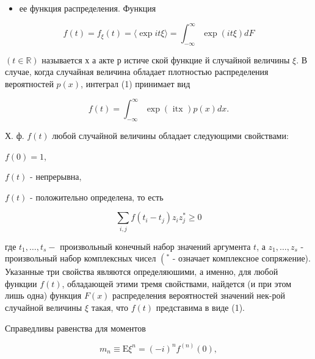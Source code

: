 \documentclass[10pt]{article}
\begin{document}
\begin{itemize}

  \item ее функция распределения. Функция

\end{itemize}



\[

f(t)=f_{\xi}(t)=\langle\exp i t \xi\rangle=\int_{-\infty}^{\infty} \exp (i t \xi) d F

\]



$(t \in \mathbb{R})$ называется х а акте р истиче ской функцие й случайной величины $\xi$. В случае, когда случайная величина обладает плотностью распределения вероятностей $p(x)$, интеграл (1) принимает вид



\[

f(t)=\int_{-\infty}^{\infty} \exp (\text { itx }) p(x) d x .

\]



Х. ф. $f(t)$ любой случайной величины обладает следующими свойствами:



$f(0)=1$,



$f(t)$ - непрерывна,



$f(t)$ - положительно определена, то есть



\[

\sum_{i, j} f\left(t_{i}-t_{j}\right) z_{i} z_{j}^{*} \geqslant 0

\]



где $t_{1}, \ldots, t_{s}-$ произвольный конечный набор значений аргумента $t$, а $z_{1}, \ldots, z_{s}$ - произвольный набор комплексных чисел $\left({ }^{*}\right.$ - означает комплексное сопряжение). Указанные три свойства являются определяюшими, а именно, для любой функции $f(t)$, обладающей этими тремя свойствами, найдется (и при этом лишь одна) функция $F(x)$ распределения вероятностей значений нек-рой случайной величины $\xi$ такая, что $f(t)$ представима в виде (1).



Справедливы равенства для моментов



\[

m_{n} \equiv \mathrm{E} \xi^{n}=(-i)^{n} f^{(n)}(0),

\]
\end{document}
